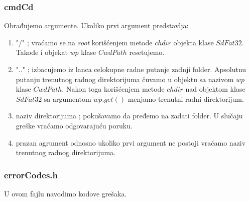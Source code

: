 \documentclass[a4paper]{extarticle}
\begin{document}
	\subsubsection{cmdCd}
	
	Obrađujemo argumente. Ukoliko prvi argument predstavlja:
	\begin{enumerate}
		\item "/" ; vraćamo se na \textit{root} korišćenjem metode $chdir$ objekta klase $SdFat32$. Takođe i objekat $wp$ klase $CwdPath$ resetujemo. 
		\item ".." ; izbacujemo iz lanca celokupne radne putanje zadnji folder. Apsolutnu putanju trenutnog radnog direktorijuma čuvamo u objektu sa nazivom $wp$ klase $CwdPath$. Nakon toga korišćenjem metode $chdir$ nad objektom klase $SdFat32$ sa argumentom $wp.get()$ menjamo trenutni radni direktorijum.
		\item naziv direktorijuma ; pokušavamo da pređemo na zadati folder. U slučaju greške vraćamo odgovarajuću poruku.
		\item prazan agrument odnosno ukoliko prvi argument ne postoji vraćamo naziv trenutnog radnog direktorijuma.
	\end{enumerate} 

	


	\subsubsection{errorCodes.h}
	
	U ovom fajlu navodimo kodove grešaka.
	
	
\end{document}
